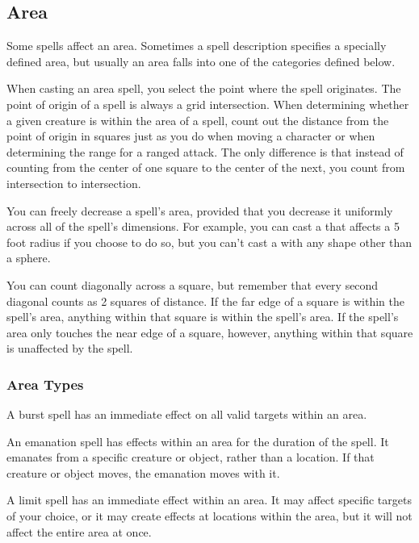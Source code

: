 \subsection{Area}\label{Spell Area}

Some spells affect an area. Sometimes a spell description specifies a specially defined area, but usually an area falls into one of the categories defined below.

When casting an area spell, you select the point where the spell originates. The point of origin of a spell is always a grid intersection. When determining whether a given creature is within the area of a spell, count out the distance from the point of origin in squares just as you do when moving a character or when determining the range for a ranged attack. The only difference is that instead of counting from the center of one square to the center of the next, you count from intersection to intersection.

You can freely decrease a spell's area, provided that you decrease it uniformly across all of the spell's dimensions. For example, you can cast a  that affects a 5 foot radius if you choose to do so, but you can't cast a  with any shape other than a sphere.

You can count diagonally across a square, but remember that every second diagonal counts as 2 squares of distance. If the far edge of a square is within the spell's area, anything within that square is within the spell's area. If the spell's area only touches the near edge of a square, however, anything within that square is unaffected by the spell.

\subsubsection{Area Types}

 A burst spell has an immediate effect on all valid targets within an area.

 An emanation spell has effects within an area for the duration of the spell. It emanates from a specific creature or object, rather than a location. If that creature or object moves, the emanation moves with it.

 A limit spell has an immediate effect within an area. It may affect specific targets of your choice, or it may create effects at locations within the area, but it will not affect the entire area at once.

